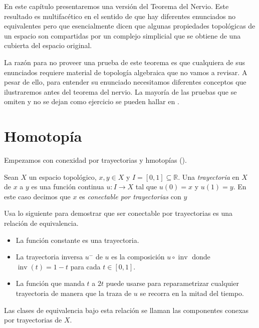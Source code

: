 \documentclass{standalone}
\begin{document}
	En este capítulo presentaremos una versión del Teorema del Nervio. Este resultado es multifacético en el sentido de que hay diferentes enunciados no equivalentes pero que esencialmente dicen que algunas propiedades topológicas de un espacio son compartidas por un complejo simplicial  que se obtiene de una cubierta del espacio original.
	
	La razón para no proveer una prueba de este teorema es que cualquiera de sus enunciados requiere material de topología algebraica que no vamos a revisar. A pesar de ello, para entender su enunciado necesitamos diferentes conceptos que ilustraremos antes del teorema del nervio.  La mayoría de las pruebas que se omiten y no se dejan como ejercicio se pueden hallar en \cite{dieck:2008:algebraic:topology,munkres:1984:algebraic:topology,rotman:1988:algebraic:topology}. 
	
	\section*{Homotopía}
	Empezamos con conexidad por trayectorias y hmotopías (\cite[Section 2.1]{dieck:2008:algebraic:topology}).
	
	\begin{definition}\label{defn:path}
		Sean $X$ un espacio topológico, $x,y\in X$ y $I=[0,1]\subseteq\mathbb{R}$. Una \emph{trayectoria} en $X$ de $x$ a $y$ es una función continua $u\colon I\rightarrow X$ tal que $u(0)=x$ y $u(1)=y$. En este caso decimos que $x$ es \emph{conectable por trayectorias} con $y$
	\end{definition}
	
	\begin{exercise}
		Usa lo siguiente para demostrar que ser conectable por trayectorias es una relación de equivalencia.
		\begin{itemize}
			\item La función constante es una trayectoria.
			\item La trayectoria inversa $u^{-}$ de $u$ es la composición $u\circ \operatorname{inv}$ donde $\operatorname{inv}(t) = 1-t$ para cada $t\in[0,1]$.
			\item La función que manda $t$ a $2t$ puede usarse para reparametrizar cualquier trayectoria de manera que la traza de $u$ se recorra en la mitad del tiempo.
		\end{itemize}
		Las clases de equivalencia bajo esta relación se llaman las componentes conexas por trayectorias de $X$.
	\end{exercise}
	
\end{document}
